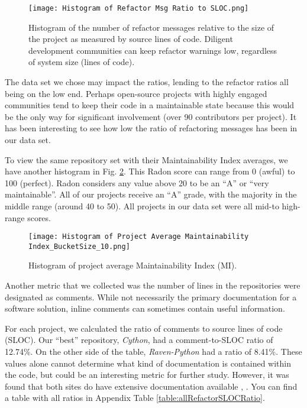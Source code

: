 \begin{figure}[ht]
  \centerline{
    \texttt{[image: Histogram of Refactor Msg Ratio to SLOC.png]}
  }
  \caption{Histogram of the number of refactor messages relative to the size of the project as measured by source lines of code. Diligent development communities can keep refactor warnings low, regardless of system size (lines of code).}
  \label{figHistogramRefactorRatio}
\end{figure}

The data set we chose may impact the ratios, lending to the refactor ratios all being on the low end. Perhaps open-source projects with highly engaged communities tend to keep their code in a maintainable state because this would be the only way for significant involvement (over 90 contributors per project). It has been interesting to see how low the ratio of refactoring messages has been in our data set.

To view the same repository set with their Maintainability Index averages, we have another histogram in Fig. \ref{figHistogramAvgMI}. This Radon score can range from 0 (awful) to 100 (perfect). Radon considers any value above 20 to be an ``A'' or ``very maintainable''. All of our projects receive an ``A'' grade, with the majority in the middle range (around 40 to 50). All projects in our data set were all mid-to high-range scores.

\begin{figure}[ht]
  \centerline{
    \texttt{[image: Histogram of Project Average Maintainability Index\_BucketSize\_10.png]}
  }
  \caption{Histogram of project average Maintainability Index (MI).}
  \label{figHistogramAvgMI}
\end{figure}

Another metric that we collected was the number of lines in the repositories were designated as comments. While not necessarily the primary documentation for a software solution, inline comments can sometimes contain useful information.

For each project, we calculated the ratio of comments to source lines of code (SLOC). Our ``best'' repository, \emph{Cython}, had a comment-to-SLOC ratio of 12.74\%. On the other side of the table, \emph{Raven-Python} had a ratio of 8.41\%. These values alone cannot determine what kind of documentation is contained within the code, but could be an interesting metric for further study. However, it was found that both sites do have extensive documentation available \cite{docs:cython}, \cite{docs:raven-python}. You can find a table with all ratios in Appendix Table \ref{table:allRefactorSLOCRatio}.
